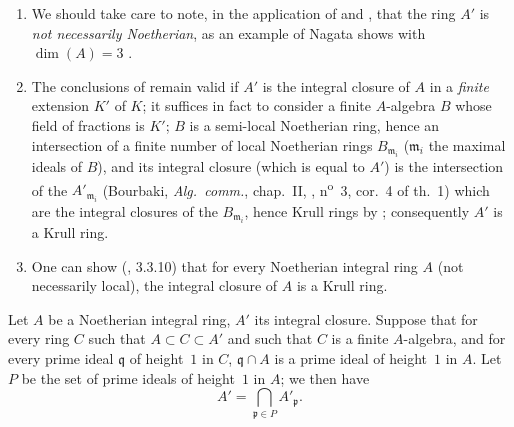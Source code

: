 \begin{remarks}[23.2.8]
\label{0.23.2.8}
\medskip\noindent
\begin{enumerate}
  \item[{\rm(i)}] We should take care to note, in the application of  and , that the ring $A'$ is \emph{not necessarily Noetherian}, as an example of Nagata shows with $\dim(A)=3$ \cite{IV-30}.
  \item[{\rm(ii)}] The conclusions of  remain valid if $A'$ is the integral closure of $A$ in a \emph{finite} extension $K'$ of $K$; it suffices in fact to consider a finite $A$-algebra $B$ whose field of fractions is $K'$; $B$ is a semi-local Noetherian ring, hence an intersection of a finite number of local Noetherian rings $B_{\mathfrak{m}_i}$ ($\mathfrak{m}_i$ the maximal ideals of $B$), and its integral closure (which is equal to $A'$) is the intersection of the $A'_{\mathfrak{m}_i}$ (Bourbaki, \emph{Alg.~comm.}, chap.~II, , n\textsuperscript{o}~3, cor.~4 of th.~1) which are the integral closures of the $B_{\mathfrak{m}_i}$, hence Krull rings by ; consequently $A'$ is a Krull ring.
  \item[{\rm(iii)}] One can show (\cite{IV-30}, 3.3.10) that for every Noetherian integral ring $A$ (not necessarily local), the integral closure of $A$ is a Krull ring.
\end{enumerate}
\end{remarks}

\begin{corollary}[23.2.9]
\label{0.23.2.9}
Let $A$ be a Noetherian integral ring, $A'$ its integral closure.
Suppose that for every ring $C$ such that $A\subset C\subset A'$ and such that $C$ is a finite $A$-algebra, and for every prime ideal $\mathfrak{q}$ of height~$1$ in $C$, $\mathfrak{q}\cap A$ is a prime ideal of height~$1$ in $A$.
Let $P$ be the set of prime ideals of height~$1$ in $A$; we then have
\[
  A'=\bigcap_{\mathfrak{p}\in P}A'_\mathfrak{p}.
\]
\end{corollary}

